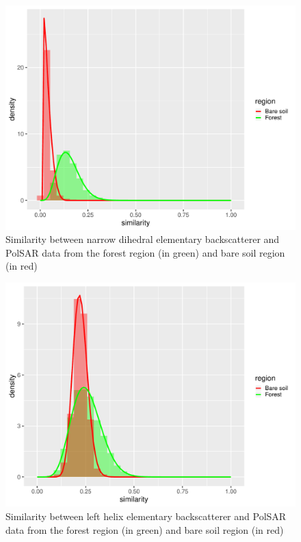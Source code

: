 \documentclass[conference]{IEEEtran}
\begin{document}
\begin{figure}[!ht]
    \centering
    \includegraphics[width = .9\linewidth, height = .7\linewidth]{../../../Figures/paper_19_05/nd.pdf}
    \caption{Similarity between narrow dihedral elementary backscatterer and PolSAR data from the forest region (in green) and bare soil region (in red)}
    \label{fig:nd}
\end{figure}

\begin{figure}[!ht]
    \centering
    \includegraphics[width = .9\linewidth, height = .7\linewidth]{../../../Figures/paper_19_05/lh.pdf}
    \caption{Similarity between left helix elementary backscatterer and PolSAR data from the forest region (in green) and bare soil region (in red)}
    \label{fig:lh}
\end{figure}
\end{document}
